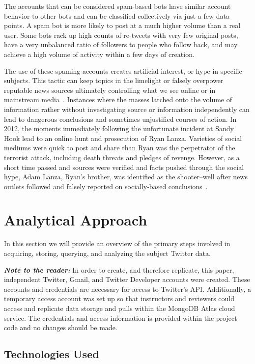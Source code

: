 The accounts that can be considered spam-based bots have similar account
behavior to other bots and can be classified collectively via just a few data
points. A spam bot is more likely to post at a much higher volume than a real
user. Some bots rack up high counts of re-tweets with very few original posts,
have a very unbalanced ratio of followers to people who follow back, and may
achieve a high volume of activity within a few days of creation.

The use of these spaming accounts creates artificial interest, or hype in
specific subjects. This tactic can keep topics in the limelight or falsely
overpower reputable news sources ultimately controlling what we see online or
in mainstream media~\cite{wikitwitterbot}. Instances where the masses latched
onto the volume of information rather without investigating source or
information independently can lead to dangerous conclusions and sometimes
unjustified courses of action. In 2012, the moments immediately following the
unfortunate incident at Sandy Hook lead to an online hunt and prosecution of
Ryan Lanza.  Varieties of social mediums were quick to post and share than Ryan
was the perpetrator of the terrorist attack, including death threats and
pledges of revenge. However, as a short time passed and sources were verified
and facts pushed through the social hype, Adam Lanza, Ryan's brother, was
identified as the shooter--well after news outlets followed and falsely
reported on socially-based conclusions~\cite{SandyHookForbes}.

\section{Analytical Approach}

In this section we will provide an overview of the primary steps involved in
acquiring, storing, querying, and analyzing the subject Twitter data.  

\textit{\bf Note to the reader:} 
In order to create, and therefore replicate, this paper, independent Twitter,
Gmail, and Twitter Developer accounts were created. These accounts and 
credentials are necessary for access to Twitter's API. Additionally, a 
temporary access account was set up so that instructors and reviewers could 
access and replicate data storage and pulls within the MongoDB Atlas cloud 
service. The credentials and access information is provided within the project
code and no changes should be made.

\subsection{Technologies Used}

